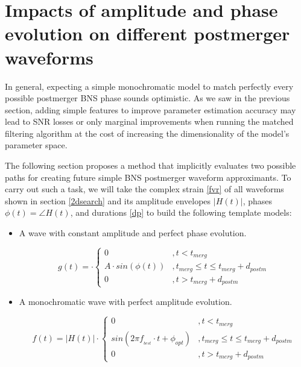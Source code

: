 \FloatBarrier





\section{Impacts of amplitude and phase evolution on different postmerger  waveforms}

In general, expecting a simple monochromatic model to match perfectly every possible postmerger BNS phase sounds optimistic. As we saw in the previous section, adding simple features to improve parameter estimation accuracy may lead to SNR losses or only marginal improvements when running the matched filtering algorithm at the cost of increasing the dimensionality of the model's parameter space.

The following section proposes a method that implicitly evaluates two possible paths for creating future simple  BNS postmerger waveform approximants. To carry out such a task, we will take the complex strain \ref{fvr} of all waveforms shown in section \ref{2dsearch} and its amplitude envelopes $|H(t)|$, phases $\phi(t)=\angle H(t)$, and durations \ref{dp} to build the following template models:

\begin{itemize}[leftmargin=*]
\item A wave with constant amplitude and perfect phase evolution.

\begin{equation}\label{pha-evol}
g(t) = \cdot \begin{cases} 
      0 &, t< t_{merg} \\
      A \cdot sin(\phi(t)) &, t_{merg} \leq t \leq t_{merg} + d_{postm} \\
      0 &, t> t_{merg} + d_{postm}
   \end{cases}
\end{equation}


\item A monochromatic wave with perfect amplitude evolution.

\begin{equation}\label{a-evol}
f(t) = |H(t)| \cdot \begin{cases} 
      0 &, t< t_{merg} \\
      sin(2\pi f_{_{best}}\cdot t + \phi_{opt}) &, t_{merg} \leq t \leq t_{merg} + d_{postm} \\
      0 &, t> t_{merg} + d_{postm}
   \end{cases}
\end{equation}

\end{itemize}


